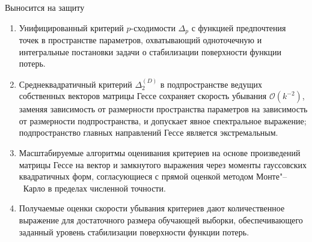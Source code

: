 \documentclass[aspectratio=169]{beamer}
\begin{document}
\begin{frame}{Выносится на защиту}
    \begin{enumerate}
        \item Унифицированный критерий $p$-сходимости $\Delta_p$ с функцией предпочтения точек в пространстве параметров, охватывающий одноточечную и интегральные постановки задачи о стабилизации поверхности функции потерь.
        \item Среднеквадратичный критерий $\Delta_2^{(D)}$ в подпространстве ведущих собственных векторов матрицы Гессе сохраняет скорость убывания $\mathcal{O}(k^{-2})$, заменяя зависимость от размерности пространства параметров на зависимость от размерности подпространства, и допускает явное спектральное выражение; подпространство главных направлений Гессе является экстремальным.
        \item Масштабируемые алгоритмы оценивания критериев на основе произведений матрицы Гессе на вектор и замкнутого выражения через моменты гауссовских квадратичных форм, согласующиеся с прямой оценкой методом Монте"--~Карло в пределах численной точности.
        \item Получаемые оценки скорости убывания критериев дают количественное выражение для достаточного размера обучающей выборки, обеспечивающего заданный уровень стабилизации поверхности функции потерь.
    \end{enumerate}
\end{frame}
\end{document}
